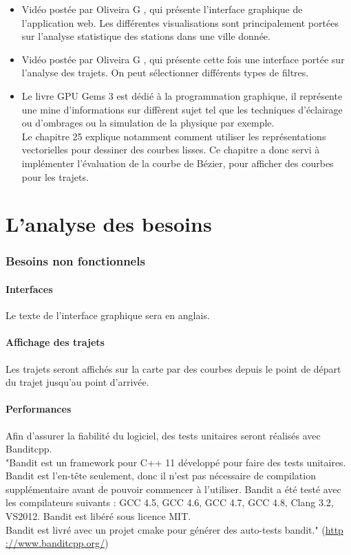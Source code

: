 \documentclass[12pt]{article}
\begin{document}
\begin{itemize}
			\item Vidéo postée par Oliveira G \cite{state_station}, qui présente l'interface
			graphique de l'application web. Les différentes visualisations sont principalement
			portées sur l'analyse statistique des stations dans une ville donnée.

			\item Vidéo postée par Oliveira G \cite{trips}, qui présente cette fois une
			interface portée sur l'analyse des trajets. On peut sélectionner différents types
			de filtres.
			
			\item Le livre GPU Gems 3 \cite{GPUGems} est dédié à la programmation graphique,
			il représente une mine d'informations sur diffèrent sujet tel que les techniques
			d'éclairage ou d'ombrages ou la simulation de la physique par exemple.\\
			Le chapitre 25 explique notamment comment utiliser les représentations vectorielles
			pour dessiner des courbes lisses. Ce chapitre a donc servi à implémenter 
			l'évaluation de la courbe de Bézier, pour afficher des courbes pour les trajets.
		\end{itemize}

\newpage
\part{L'analyse des besoins}

	\section{Besoins non fonctionnels}
		\subsection{Interfaces}
		Le texte de l’interface graphique sera en anglais.

		\subsection{Affichage des trajets}
		Les trajets seront affichés sur la carte par des courbes depuis le point de départ du
		trajet jusqu’au point d’arrivée.

		\subsection{Performances}
		Afin d’assurer la fiabilité du logiciel, des tests unitaires seront réalisés avec
		Banditcpp.\\
		"Bandit est un framework pour C++ 11 développé pour faire des tests unitaires. Bandit est
		l’en-tête seulement, donc il n’est pas nécessaire de compilation supplémentaire avant de
		pouvoir commencer à l’utiliser. Bandit a été testé avec les compilateurs suivants :
		GCC 4.5, GCC 4.6, GCC 4.7, GCC 4.8, Clang 3.2, VS2012.
		Bandit est libéré sous licence MIT. \\
		Bandit est livré avec un projet cmake pour générer des auto-tests bandit."
		(\url{http ://www.banditcpp.org/})\\
	
\end{document}
